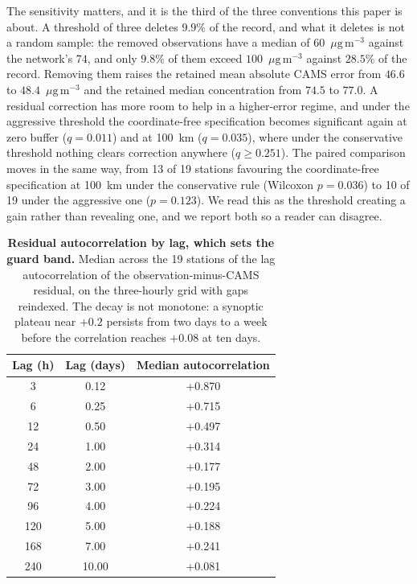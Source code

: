 \documentclass[11pt]{article}
\newcommand*{\ugm}{\ensuremath{\mu\mathrm{g\,m^{-3}}}}
\begin{document}
The sensitivity matters, and it is the third of the three conventions this paper is about.
A threshold of three deletes $9.9\%$ of the record, and what it deletes is not a random
sample: the removed observations have a median of $60$~\ugm{} against the network's $74$,
and only $9.8\%$ of them exceed $100$~\ugm{} against $28.5\%$ of the record. Removing them
raises the retained mean absolute CAMS error from $46.6$ to $48.4$~\ugm{} and the retained
median concentration from $74.5$ to $77.0$. A residual correction has more room to help in
a higher-error regime, and under the aggressive threshold the coordinate-free specification
becomes significant again at zero buffer ($q=0.011$) and at 100~km ($q=0.035$), where under
the conservative threshold nothing clears correction anywhere ($q\geq0.251$). The paired
comparison moves in the same way, from 13 of 19 stations favouring the coordinate-free
specification at 100~km under the conservative rule (Wilcoxon $p=0.036$) to 10 of 19 under
the aggressive one ($p=0.123$). We read this as the threshold creating a gain rather
than revealing one, and we report both so a reader can disagree.

\begin{table}[htbp]\centering\footnotesize
\caption{\textbf{Residual autocorrelation by lag, which sets the guard band.} Median across the 19 stations of the lag autocorrelation of the observation-minus-CAMS residual, on the three-hourly grid with gaps reindexed. The decay is not monotone: a synoptic plateau near $+0.2$ persists from two days to a week before the correlation reaches $+0.08$ at ten days.}
\label{si:t32}
\begin{tabular}{ccc}\toprule
Lag (h) & Lag (days) & Median autocorrelation \\ \midrule
3 & 0.12 & +0.870 \\
6 & 0.25 & +0.715 \\
12 & 0.50 & +0.497 \\
24 & 1.00 & +0.314 \\
48 & 2.00 & +0.177 \\
72 & 3.00 & +0.195 \\
96 & 4.00 & +0.224 \\
120 & 5.00 & +0.188 \\
168 & 7.00 & +0.241 \\
240 & 10.00 & +0.081 \\
\bottomrule\end{tabular}\end{table}
\end{document}
